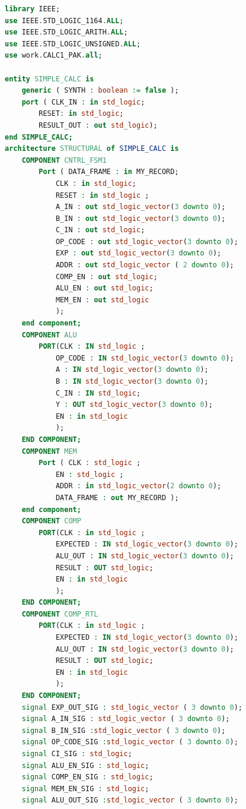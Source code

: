 \documentclass{article}
\begin{document}
    \begin{lstlisting}[language=VHDL,caption=Top-level of SIMPLE\_CALC]
library IEEE;
use IEEE.STD_LOGIC_1164.ALL;
use IEEE.STD_LOGIC_ARITH.ALL;
use IEEE.STD_LOGIC_UNSIGNED.ALL;
use work.CALC1_PAK.all;

entity SIMPLE_CALC is
    generic ( SYNTH : boolean := false );
    port ( CLK_IN : in std_logic;
        RESET: in std_logic;				   
        RESULT_OUT : out std_logic);
end SIMPLE_CALC;
architecture STRUCTURAL of SIMPLE_CALC is
    COMPONENT CNTRL_FSM1
        Port ( DATA_FRAME : in MY_RECORD;
            CLK : in std_logic;
            RESET : in std_logic ;
            A_IN : out std_logic_vector(3 downto 0);
            B_IN : out std_logic_vector(3 downto 0);
            C_IN : out std_logic;
            OP_CODE : out std_logic_vector(3 downto 0);
            EXP : out std_logic_vector(3 downto 0);
            ADDR : out std_logic_vector ( 2 downto 0);
            COMP_EN : out std_logic;
            ALU_EN : out std_logic;
            MEM_EN : out std_logic  
            );
    end component;
    COMPONENT ALU
        PORT(CLK : IN std_logic ;
            OP_CODE : IN std_logic_vector(3 downto 0);
            A : IN std_logic_vector(3 downto 0);
            B : IN std_logic_vector(3 downto 0);
            C_IN : IN std_logic;          
            Y : OUT std_logic_vector(3 downto 0);
            EN : in std_logic
            );
    END COMPONENT;
    COMPONENT MEM 
        Port ( CLK : std_logic ;
            EN : std_logic ;
            ADDR : in std_logic_vector(2 downto 0);
            DATA_FRAME : out MY_RECORD );
    end component;
    COMPONENT COMP
        PORT(CLK : in std_logic ;
            EXPECTED : IN std_logic_vector(3 downto 0);
            ALU_OUT : IN std_logic_vector(3 downto 0);          
            RESULT : OUT std_logic;
            EN : in std_logic
            );
    END COMPONENT;
    COMPONENT COMP_RTL
        PORT(CLK : in std_logic ;
            EXPECTED : IN std_logic_vector(3 downto 0);
            ALU_OUT : IN std_logic_vector(3 downto 0);          
            RESULT : OUT std_logic;
            EN : in std_logic
            );
    END COMPONENT;
    signal EXP_OUT_SIG : std_logic_vector ( 3 downto 0);
    signal A_IN_SIG : std_logic_vector ( 3 downto 0);
    signal B_IN_SIG :std_logic_vector ( 3 downto 0);
    signal OP_CODE_SIG :std_logic_vector ( 3 downto 0);
    signal CI_SIG : std_logic;
    signal ALU_EN_SIG : std_logic;
    signal COMP_EN_SIG : std_logic;
    signal MEM_EN_SIG : std_logic;
    signal ALU_OUT_SIG :std_logic_vector ( 3 downto 0);

\end{lstlisting}
\end{document}
